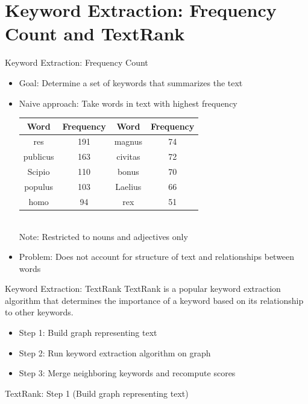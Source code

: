\documentclass{beamer}
\begin{document}
\section{Keyword Extraction: Frequency Count and TextRank}

\begin{frame}{Keyword Extraction: Frequency Count}
\begin{itemize}
		\setlength\itemsep{1em}
	\item Goal: Determine a set of keywords that summarizes the text
	\item Naive approach: Take words in text with highest frequency
	\begin{center}
	\begin{tabular}{| c | c || c | c |}
		\hline
		\textbf{Word} & \textbf{Frequency} & \textbf{Word} & \textbf{Frequency} \\ \hline
		res & 191 & magnus & 74 \\ \hline
		publicus & 163 & civitas & 72 \\ \hline
		Scipio & 110 & bonus & 70  \\ \hline
		populus & 103 & Laelius & 66  \\ \hline
		homo & 94 & rex & 51  \\
		\hline
\end{tabular}\\
\footnotesize{Note: Restricted to nouns and adjectives only}
\end{center}
	
	\item Problem: Does not account for structure of text and relationships between words
\end{itemize}
\end{frame}

\begin{frame}{Keyword Extraction: TextRank}
TextRank is a popular keyword extraction algorithm that determines the importance of a keyword based on its relationship to other keywords.
\begin{itemize}

	\item Step 1: Build graph representing text
	\item Step 2: Run keyword extraction algorithm on graph
	\item Step 3: Merge neighboring keywords and recompute scores
\end{itemize}
\end{frame}


\begin{frame}{TextRank: Step 1 (Build graph representing text)}

\end{frame}
\end{document}
